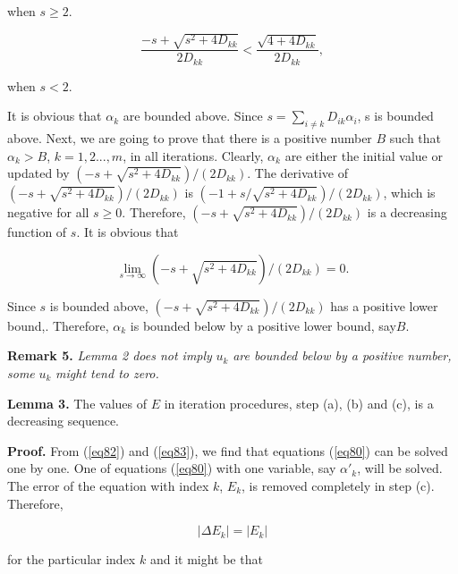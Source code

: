\documentclass [18pt]{article}
\begin{document}
\noindent
when $s \ge 2$.


\begin{equation}
\label{eq85}
\frac{ - s + \sqrt {s^2 + 4D_{kk} } }{2D_{kk} } < \frac{\sqrt {4 + 4D_{kk} }
}{2D_{kk} },
\end{equation}



\noindent
when $s < 2$.

It is obvious that $\alpha _k $ are bounded above. Since $s = \sum\limits_{i
\ne k} {D_{ik} \alpha _i } $, s is bounded above. Next, we are going to
prove that there is a positive number $B$ such that $\alpha _k > B$, $k =
1,2...,m$, in all iterations. Clearly, $\alpha _k $ are either the initial
value or updated by $( - s + \sqrt {s^2 + 4D_{kk} } ) / (2D_{kk} )$. The
derivative of $( - s + \sqrt {s^2 + 4D_{kk} } ) / (2D_{kk} )$ is $( - 1 +
s / \sqrt {s^2 + 4D_{kk} } ) / (2D_{kk} )$, which is negative for all $s \ge
0$. Therefore, $( - s + \sqrt {s^2 + 4D_{kk} } ) / (2D_{kk} )$ is a decreasing
function of $s$. It is obvious that


\begin{equation}
\label{eq86}
\mathop {\lim }\limits_{s \to \infty } ( - s + \sqrt {s^2 + 4D_{kk} } ) /
(2D_{kk} ) = 0.
\end{equation}



Since $s$ is bounded above, $( - s + \sqrt {s^2 + 4D_{kk} } ) / (2D_{kk} )$
has a positive lower bound,. Therefore, $\alpha _k $ is bounded below by a
positive lower bound, say$B$.

\textbf{Remark 5.} \textit{Lemma 2 does not imply }$u_k $\textit{ are bounded below by a positive number, some }$u_k $\textit{ might tend to zero.}

\textbf{Lemma 3. }The values of $E$ in iteration procedures, step (a), (b)
and (c), is a decreasing sequence.

\textbf{Proof.} From (\ref{eq82}) and (\ref{eq83}), we find that equations (\ref{eq80}) can be
solved one by one. One of equations (\ref{eq80}) with one variable, say $\alpha '_k
$, will be solved. The error of the equation with index $k$, $E_k $, is
removed completely in step (c). Therefore,


\begin{equation}
\label{eq87}
\left| {\Delta E_k } \right| = \left| {E_k } \right|
\end{equation}



\noindent
for the particular index $k$ and it might be that
\end{document}
